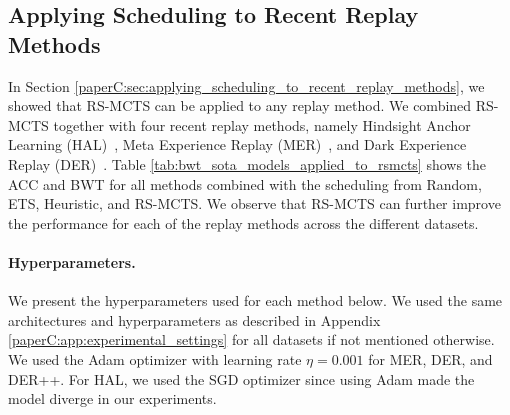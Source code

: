 \subsection{Applying Scheduling to Recent Replay Methods}
\label{paperC:app:apply_scheduling_to_recent_replay_methods}

In Section \ref{paperC:sec:applying_scheduling_to_recent_replay_methods}, we showed that RS-MCTS can be applied to any replay method. We combined RS-MCTS together with four recent replay methods, namely Hindsight Anchor Learning (HAL)~, Meta Experience Replay (MER)~, and Dark Experience Replay (DER)~. Table \ref{tab:bwt_sota_models_applied_to_rsmcts} shows the ACC and BWT for all methods combined with the scheduling from Random, ETS, Heuristic, and RS-MCTS. We observe that RS-MCTS can further improve the performance for each of the replay methods across the different datasets.  

\paragraph{Hyperparameters.} We present the hyperparameters used for each method below. We used the same architectures and hyperparameters as described in Appendix \ref{paperC:app:experimental_settings} for all datasets if not mentioned otherwise. We used the Adam optimizer with learning rate $\eta=0.001$ for MER, DER, and DER++. For HAL, we used the SGD optimizer since using Adam made the model diverge in our experiments.  

